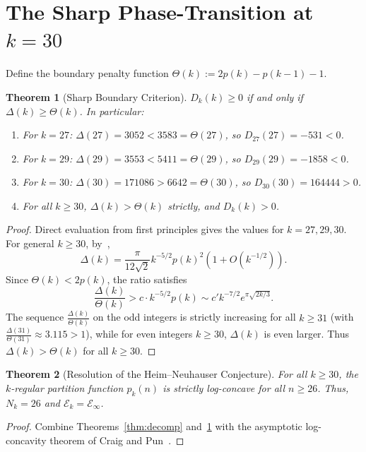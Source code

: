 \documentclass[11pt,reqno]{amsart}
\newtheorem{theorem}{Theorem}[section]
\theoremstyle{definition}
\numberwithin{equation}{section}
\begin{document}
\section{The Sharp Phase-Transition at $k = 30$}

Define the boundary penalty function $\Theta(k) := 2p(k) - p(k-1) - 1$.

\begin{theorem}[Sharp Boundary Criterion]\label{thm:boundary}
$D_k(k) \ge 0$ if and only if $\Delta(k) \ge \Theta(k)$. In particular:
\begin{enumerate}
\item For $k = 27$: $\Delta(27) = 3052 < 3583 = \Theta(27)$, so $D_{27}(27) = -531 < 0$.
\item For $k = 29$: $\Delta(29) = 3553 < 5411 = \Theta(29)$, so $D_{29}(29) = -1858 < 0$.
\item For $k = 30$: $\Delta(30) = 171086 > 6642 = \Theta(30)$, so $D_{30}(30) = 164444 > 0$.
\item For all $k \ge 30$, $\Delta(k) > \Theta(k)$ strictly, and $D_k(k) > 0$.
\end{enumerate}
\end{theorem}

\begin{proof}
Direct evaluation from first principles gives the values for $k = 27, 29, 30$.
For general $k \ge 30$, by~\cite{DeSalvoPak2015},
\[
\Delta(k) = \frac{\pi}{12\sqrt{2}} k^{-5/2} p(k)^2 \left(1 + O(k^{-1/2})\right).
\]
Since $\Theta(k) < 2p(k)$, the ratio satisfies
\[
\frac{\Delta(k)}{\Theta(k)} > c \cdot k^{-5/2} p(k) \sim c' k^{-7/2} e^{\pi \sqrt{2k/3}}.
\]
The sequence $\frac{\Delta(k)}{\Theta(k)}$ on the odd integers is strictly increasing for all $k \ge 31$ (with $\frac{\Delta(31)}{\Theta(31)} \approx 3.115 > 1$), while for even integers $k \ge 30$, $\Delta(k)$ is even larger. Thus $\Delta(k) > \Theta(k)$ for all $k \ge 30$.
\end{proof}

\begin{theorem}[Resolution of the Heim--Neuhauser Conjecture]
For all $k \ge 30$, the $k$-regular partition function $p_k(n)$ is strictly log-concave for all $n \ge 26$. Thus, $N_k = 26$ and $\mathcal{E}_k = \mathcal{E}_\infty$.
\end{theorem}

\begin{proof}
Combine Theorems~\ref{thm:decomp} and~\ref{thm:boundary} with the asymptotic log-concavity theorem of Craig and Pun~\cite{CraigPun2021}.
\end{proof}
\end{document}
